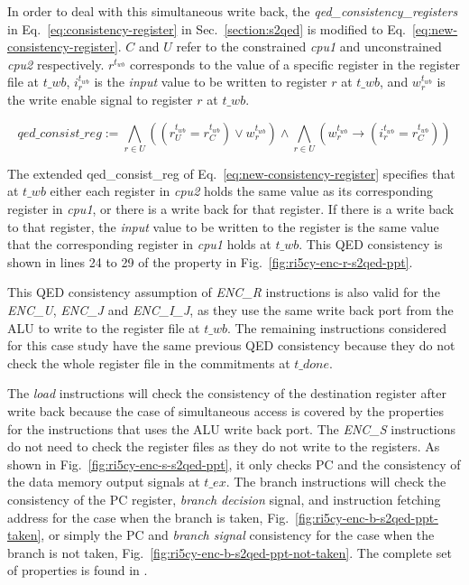 In order to deal with this simultaneous write back, the \textit{qed\_consistency\_registers} in Eq.~\ref{eq:consistency-register} in Sec.~\ref{section:s2qed} is modified to Eq.~\ref{eq:new-consistency-register}. $C$ and $U$ refer to the constrained \textit{cpu1} and unconstrained \textit{cpu2} respectively. $r^{t_{wb}}$ corresponds to the value of a specific register in the register file at $t\_wb$, $i^{t_{wb}}_r$ is the \textit{input} value to be written to register $r$ at $t\_wb$, and $w^{t_{wb}}_r $ is the write enable signal to register $r$ at $t\_wb$.

\begin{equation}
    qed\_consist\_reg := \bigwedge_{r \in U} \left((r^{t_{wb}}_U = r^{t_{wb}}_C) \lor w^{t_{wb}}_r\right) \land \bigwedge_{r \in U} \left(w^{t_{wb}}_r \rightarrow (i^{t_{wb}}_r = r^{t_{wb}}_C)\right)
    \label{eq:new-consistency-register}
\end{equation}

The extended qed\_consist\_reg of Eq.~\ref{eq:new-consistency-register} specifies that at $t\_wb$ either each register in \textit{cpu2} holds the same value as its corresponding register in \textit{cpu1}, or there is a write back for that register. If there is a write back to that register, the \textit{input} value to be written to the register is the same value that the corresponding register in \textit{cpu1} holds at $t\_wb$. This QED consistency is shown in lines 24 to 29 of the property in Fig.~\ref{fig:ri5cy-enc-r-s2qed-ppt}.

This QED consistency assumption of \textit{ENC\_R} instructions is also valid for the \textit{ENC\_U}, \textit{ENC\_J} and \textit{ENC\_I\_J}, as they use the same write back port from the ALU to write to the register file at $t\_wb$. The remaining instructions considered for this case study have the same previous QED consistency because they do not check the whole register file in the commitments at $t\_done$.

The \textit{load} instructions will check the consistency of the destination register after write back because the case of simultaneous access is covered by the properties for the instructions that uses the ALU write back port. The \textit{ENC\_S} instructions do not need to check the register files as they do not write to the registers. As shown in Fig.~\ref{fig:ri5cy-enc-s-s2qed-ppt}, it only checks PC and the consistency of the data memory output signals at $t\_ex$. The branch instructions will check the consistency of the PC register, \textit{branch decision} signal, and instruction fetching address for the case when the branch is taken, Fig.~\ref{fig:ri5cy-enc-b-s2qed-ppt-taken}, or simply the PC and \textit{branch signal} consistency for the case when the branch is not taken, Fig.~\ref{fig:ri5cy-enc-b-s2qed-ppt-not-taken}. The complete set of \SSQED{} properties is found in \cite{descam}.

